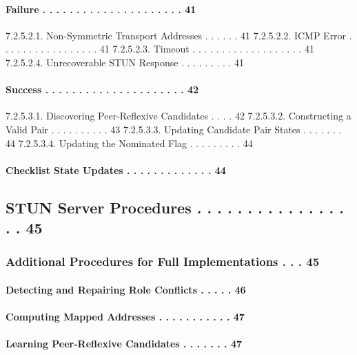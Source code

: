 \documentclass{article}
\begin{document}
\paragraph{Failure . . . . . . . . . . . . . . . . . . . . .  41}

7.2.5.2.1.  Non-Symmetric Transport Addresses . . . . . .  41 7.2.5.2.2.  ICMP Error  . . . . . . . . . . . . . . . . .  41 7.2.5.2.3.  Timeout . . . . . . . . . . . . . . . . . . .  41 7.2.5.2.4.  Unrecoverable STUN Response . . . . . . . . .  41

\paragraph{Success . . . . . . . . . . . . . . . . . . . . .  42}

7.2.5.3.1.  Discovering Peer-Reflexive Candidates . . . .  42 7.2.5.3.2.  Constructing a Valid Pair . . . . . . . . . .  43 7.2.5.3.3.  Updating Candidate Pair States  . . . . . . .  44 7.2.5.3.4.  Updating the Nominated Flag . . . . . . . . .  44

\paragraph{Checklist State Updates . . . . . . . . . . . . .  44}

\subsection{STUN Server Procedures  . . . . . . . . . . . . . . . . .  45}

\subsubsection{Additional Procedures for Full Implementations  . . .  45}

\paragraph{Detecting and Repairing Role Conflicts  . . . . .  46}

\paragraph{Computing Mapped Addresses  . . . . . . . . . . .  47}

\paragraph{Learning Peer-Reflexive Candidates  . . . . . . .  47}
\end{document}
